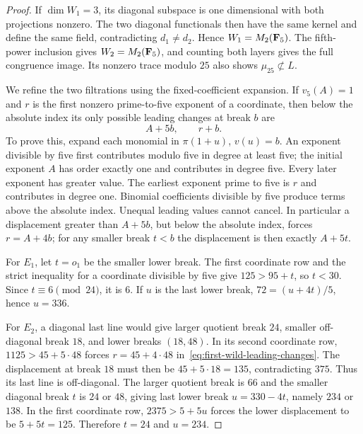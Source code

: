\begin{proof}
If $\dim W_1=3$, its diagonal subspace is one dimensional with both projections nonzero. The two diagonal functionals then have the same kernel and define the same field, contradicting $d_1\ne d_2$. Hence $W_1=M_2(\mathbf F_5)$. The fifth-power inclusion gives $W_2=M_2(\mathbf F_5)$, and counting both layers gives the full congruence image. Its nonzero trace modulo $25$ also shows $\mu_{25}\not\subset L$.

We refine the two filtrations using the fixed-coefficient expansion. If $v_5(A)=1$ and $r$ is the first nonzero prime-to-five exponent of a coordinate, then below the absolute index its only possible leading changes at break $b$ are
\begin{equation}\label{eq:first-wild-leading-changes}
                              A+5b,\qquad r+b.
\end{equation}
To prove this, expand each monomial in $\pi(1+u)$, $v(u)=b$. An exponent divisible by five first contributes modulo five in degree at least five; the initial exponent $A$ has order exactly one and contributes in degree five. Every later exponent has greater value. The earliest exponent prime to five is $r$ and contributes in degree one. Binomial coefficients divisible by five produce terms above the absolute index. Unequal leading values cannot cancel. In particular a displacement greater than $A+5b$, but below the absolute index, forces $r=A+4b$; for any smaller break $t<b$ the displacement is then exactly $A+5t$.

For $E_1$, let $t=o_1$ be the smaller lower break. The first coordinate row and the strict inequality for a coordinate divisible by five give $125>95+t$, so $t<30$. Since $t\equiv6\pmod{24}$, it is $6$. If $u$ is the last lower break, $72=(u+4t)/5$, hence $u=336$.

For $E_2$, a diagonal last line would give larger quotient break $24$, smaller off-diagonal break $18$, and lower breaks $(18,48)$. In its second coordinate row, $1125>45+5\cdot48$ forces $r=45+4\cdot48$ in~\eqref{eq:first-wild-leading-changes}. The displacement at break $18$ must then be $45+5\cdot18=135$, contradicting $375$. Thus its last line is off-diagonal. The larger quotient break is $66$ and the smaller diagonal break $t$ is $24$ or $48$, giving last lower break $u=330-4t$, namely $234$ or $138$. In the first coordinate row, $2375>5+5u$ forces the lower displacement to be $5+5t=125$. Therefore $t=24$ and $u=234$.


\end{proof}
